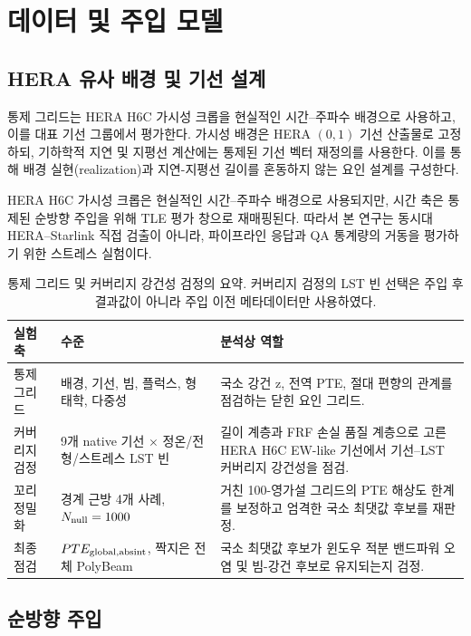 \documentclass[final,5p,times]{elsarticle}
\begin{document}
\section{데이터 및 주입 모델}
\label{sec:data}

\subsection{HERA 유사 배경 및 기선 설계}
\label{sec:data:backgrounds}

통제 그리드는 HERA H6C 가시성 크롭을 현실적인 시간--주파수 배경으로 사용하고, 이를 대표
기선 그룹에서 평가한다. 가시성 배경은 HERA $(0,1)$ 기선 산출물로 고정하되, 기하학적
지연 및 지평선 계산에는 통제된 기선 벡터 재정의를 사용한다. 이를 통해 배경 실현(realization)과
지연-지평선 길이를 혼동하지 않는 요인 설계를 구성한다.

HERA H6C 가시성 크롭은 현실적인 시간--주파수 배경으로 사용되지만, 시간 축은 통제된 순방향
주입을 위해 TLE 평가 창으로 재매핑된다. 따라서 본 연구는 동시대 HERA--Starlink 직접 검출이
아니라, 파이프라인 응답과 QA 통계량의 거동을 평가하기 위한 스트레스 실험이다.

\begin{table}[!t]
\centering
\small
\caption{통제 그리드 및 커버리지 강건성 검정의 요약. 커버리지 검정의 LST 빈 선택은 주입 후 결과값이 아니라 주입 이전 메타데이터만 사용하였다.}
\label{tab:design_overview_revised}
\begin{tabularx}{\textwidth}{>{\raggedright\arraybackslash}p{3.1cm} >{\raggedright\arraybackslash}p{3.2cm} X}
\toprule
실험 축 & 수준 & 분석상 역할 \\
\midrule
통제 그리드 & 배경, 기선, 빔, 플럭스, 형태학, 다중성 & 국소 강건 z, 전역 PTE, 절대 편향의 관계를 점검하는 닫힌 요인 그리드. \\
커버리지 검정 & 9개 native 기선 $\times$ 정온/전형/스트레스 LST 빈 & 길이 계층과 FRF 손실 품질 계층으로 고른 HERA H6C EW-like 기선에서 기선--LST 커버리지 강건성을 점검. \\
꼬리 정밀화 & 경계 근방 4개 사례, $N_{\rm null}=1000$ & 거친 100-영가설 그리드의 PTE 해상도 한계를 보정하고 엄격한 국소 최댓값 후보를 재판정. \\
최종 점검 & $PTE_{\rm global,absint}$, 짝지은 전체 PolyBeam & 국소 최댓값 후보가 윈도우 적분 밴드파워 오염 및 빔-강건 후보로 유지되는지 검정. \\
\bottomrule
\end{tabularx}
\end{table}

\subsection{순방향 주입}
\label{sec:data:forward}
\end{document}
